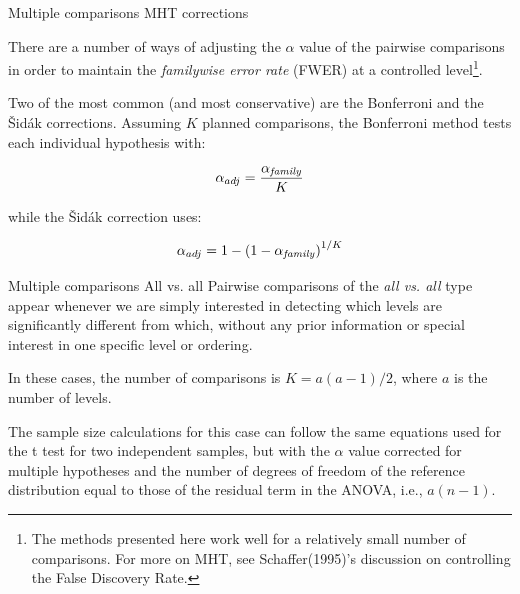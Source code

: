 %
%
\begin{frame}
{Multiple comparisons}
{MHT corrections}

There are a number of ways of adjusting the $\alpha$ value of the pairwise comparisons in order to maintain the \textit{familywise error rate} (FWER) at a controlled level\footnote[3]{The methods presented here work well for a relatively small number of comparisons. For more on MHT, see Schaffer(1995)'s discussion on controlling the False Discovery Rate.}.\bigskip

Two of the most common (and most conservative) are the Bonferroni and the \v{S}id\'ak corrections. Assuming $K$ planned comparisons, the Bonferroni method tests each individual hypothesis with:

\begin{equation*}
\alpha_{adj}=\frac{\alpha_{\mbox{\scriptsize \textit{family}}}}{K}
\end{equation*}

\noindent while the \v{S}id\'ak correction uses:

\begin{equation*}
\alpha_{adj}=1 - \left(1-\alpha_{\mbox{\scriptsize \textit{family}}}\right)^{1/K}
\end{equation*}
\end{frame}
%
%
\begin{frame}
{Multiple comparisons}
{All vs. all}
Pairwise comparisons of the \textit{all vs. all} type appear whenever we are simply interested in detecting which levels are significantly different from which, without any prior information or special interest in one specific level or ordering.\bigskip

In these cases, the number of comparisons is $K=a(a-1)/2$, where $a$ is the number of levels.\bigskip

The sample size calculations for this case can follow the same equations used for the t test for two independent samples, but with the $\alpha$ value corrected for multiple hypotheses and the number of degrees of freedom of the reference distribution equal to those of the residual term in the ANOVA, i.e., $a(n-1)$.
\end{frame}
%
%
